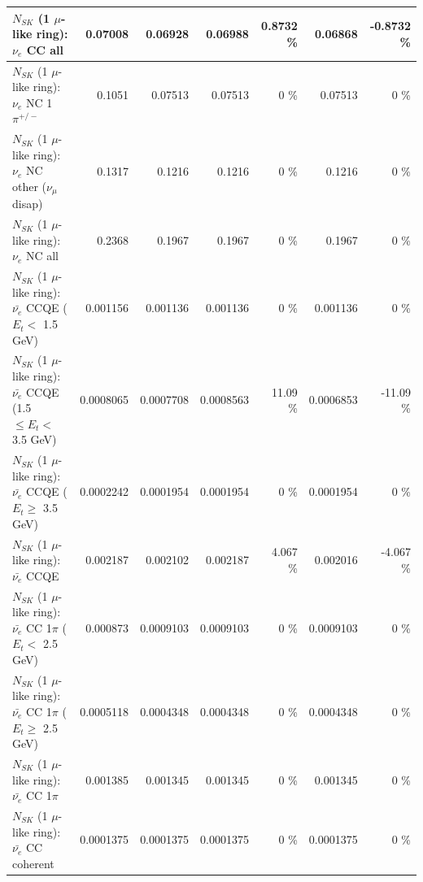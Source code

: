 \begin{table}
\begin{tabular}{| l | r | r | r  r | r  r |}
                                  $N_{SK}$ (1 $\mu$-like ring): $\nu_{e}$ CC all &         0.07008 &         0.06928 &         0.06988 &   0.8732 \%  &         0.06868 &  -0.8732 \%  \\ 
\hline
                           $N_{SK}$ (1 $\mu$-like ring): $\nu_e$ NC 1$\pi^{+/-}$ &          0.1051 &         0.07513 &         0.07513 &        0 \%  &         0.07513 &        0 \%  \\ 
                $N_{SK}$ (1 $\mu$-like ring): $\nu_e$ NC other ($\nu_\mu$ disap) &          0.1317 &          0.1216 &          0.1216 &        0 \%  &          0.1216 &        0 \%  \\ 
                                  $N_{SK}$ (1 $\mu$-like ring): $\nu_{e}$ NC all &          0.2368 &          0.1967 &          0.1967 &        0 \%  &          0.1967 &        0 \%  \\ 
\hline
\hline
\hline
            $N_{SK}$ (1 $\mu$-like ring): $\bar{\nu_e}$ CCQE ($E_{t} <$ 1.5 GeV) &        0.001156 &        0.001136 &        0.001136 &        0 \%  &        0.001136 &        0 \%  \\ 
   $N_{SK}$ (1 $\mu$-like ring): $\bar{\nu_e}$ CCQE (1.5 $\leq E_{t} <$ 3.5 GeV) &       0.0008065 &       0.0007708 &       0.0008563 &    11.09 \%  &       0.0006853 &   -11.09 \%  \\ 
         $N_{SK}$ (1 $\mu$-like ring): $\bar{\nu_e}$ CCQE ($E_{t} \geq$ 3.5 GeV) &       0.0002242 &       0.0001954 &       0.0001954 &        0 \%  &       0.0001954 &        0 \%  \\ 
\hline
                                $N_{SK}$ (1 $\mu$-like ring): $\bar{\nu_e}$ CCQE &        0.002187 &        0.002102 &        0.002187 &    4.067 \%  &        0.002016 &   -4.067 \%  \\ 
\hline
       $N_{SK}$ (1 $\mu$-like ring): $\bar{\nu_e}$ CC 1$\pi$ ($E_{t} <$ 2.5 GeV) &        0.000873 &       0.0009103 &       0.0009103 &        0 \%  &       0.0009103 &        0 \%  \\ 
    $N_{SK}$ (1 $\mu$-like ring): $\bar{\nu_e}$ CC 1$\pi$ ($E_{t} \geq$ 2.5 GeV) &       0.0005118 &       0.0004348 &       0.0004348 &        0 \%  &       0.0004348 &        0 \%  \\ 
\hline
                           $N_{SK}$ (1 $\mu$-like ring): $\bar{\nu_e}$ CC 1$\pi$ &        0.001385 &        0.001345 &        0.001345 &        0 \%  &        0.001345 &        0 \%  \\ 
                         $N_{SK}$ (1 $\mu$-like ring): $\bar{\nu_e}$ CC coherent &       0.0001375 &       0.0001375 &       0.0001375 &        0 \%  &       0.0001375 &        0 \%  \\ 

\end{tabular}
\end{table}
